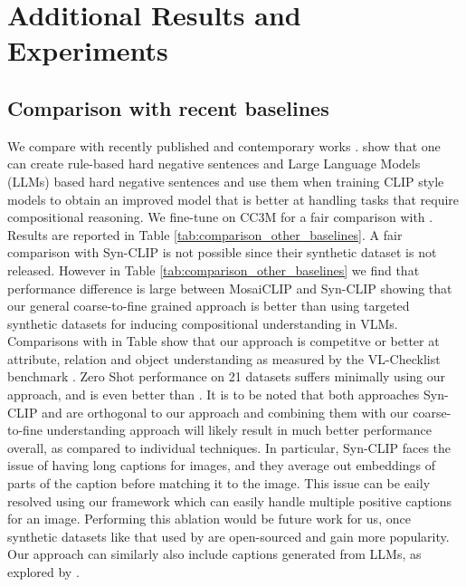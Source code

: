 \documentclass[11pt]{article}
\newcommand{\methodcomp}{MosaiCLIP}
\newcommand{\negclip}{NegCLIP}
\begin{document}
\begin{table}[h!]
\begin{table}[h!]
    \caption{Performance of \negclip{} with increasing batch size. A batch size of B corresponds to an effective batch size of 8*B in \negclip{} after image and text negative mining. Fine-tuning dataset: CC-FT.}
    \label{scale_negclip_batch_size}
\end{table}

\section{Additional Results and Experiments}
\label{additional_expt_results}

\subsection{Comparison with recent baselines}
\label{comparison_other_baselines}
We compare with recently published and contemporary works \citep{cascantebonilla2023going, doveh2023teaching}. \citet{doveh2023teaching} show that one can create rule-based hard negative sentences and Large Language Models (LLMs) based hard negative sentences and use them when training CLIP style models to obtain an improved model that is better at handling tasks that require compositional reasoning.
We fine-tune on CC3M \citep{sharma-etal-2018-conceptual} for a fair comparison with \citet{doveh2023teaching}. Results are reported in Table \ref{tab:comparison_other_baselines}. A fair comparison with Syn-CLIP \citet{cascantebonilla2023going} is not possible since their synthetic dataset is not released. However in Table \ref{tab:comparison_other_baselines} we find that performance difference is large between \methodcomp{} and Syn-CLIP showing that our general coarse-to-fine grained approach is better than using targeted synthetic datasets for inducing compositional understanding in VLMs. Comparisons with \citet{doveh2023teaching} in Table show that our approach is competitve or better at attribute, relation and object understanding as measured by the VL-Checklist benchmark \citep{zhao2022vlchecklist}. Zero Shot performance on 21 datasets suffers minimally using our approach, and is even better than \citep{zhao2022vlchecklist}. It is to be noted that both approaches Syn-CLIP \citep{cascantebonilla2023going} and \citet{doveh2023teaching} are orthogonal to our approach and combining them with our coarse-to-fine understanding approach will likely result in much better performance overall, as compared to individual techniques. In particular, Syn-CLIP \citep{cascantebonilla2023going} faces the issue of having long captions for images, and they average out embeddings of parts of the caption before matching it to the image. This issue can be eaily resolved using our framework which can easily handle multiple positive captions for an image. Performing this ablation would be future work for us, once synthetic datasets like that used by \citet{cascantebonilla2023going} are open-sourced and gain more popularity. Our approach can similarly also include captions generated from LLMs, as explored by \citet{doveh2023teaching}.


\end{table}
\end{document}
